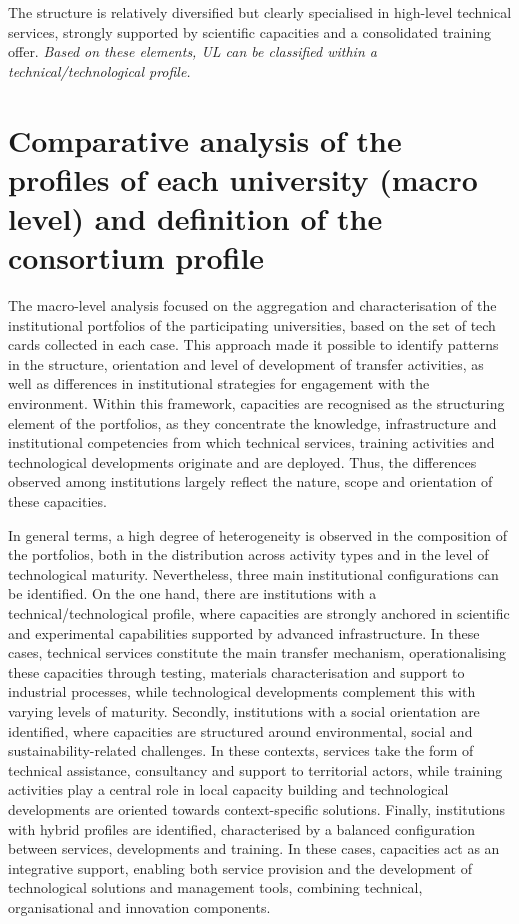 \documentclass[
  12pt,
  oneside]{book}
\begin{document}
The structure is relatively diversified but clearly specialised in
high-level technical services, strongly supported by scientific
capacities and a consolidated training offer. \emph{Based on these
elements, UL can be classified within a technical/technological
profile.}

\section{Comparative analysis of the profiles of each university (macro
level) and definition of the consortium
profile}\label{comparative-analysis-of-the-profiles-of-each-university-macro-level-and-definition-of-the-consortium-profile}

The macro-level analysis focused on the aggregation and characterisation
of the institutional portfolios of the participating universities, based
on the set of tech cards collected in each case. This approach made it
possible to identify patterns in the structure, orientation and level of
development of transfer activities, as well as differences in
institutional strategies for engagement with the environment. Within
this framework, capacities are recognised as the structuring element of
the portfolios, as they concentrate the knowledge, infrastructure and
institutional competencies from which technical services, training
activities and technological developments originate and are deployed.
Thus, the differences observed among institutions largely reflect the
nature, scope and orientation of these capacities.

In general terms, a high degree of heterogeneity is observed in the
composition of the portfolios, both in the distribution across activity
types and in the level of technological maturity. Nevertheless, three
main institutional configurations can be identified. On the one hand,
there are institutions with a technical/technological profile, where
capacities are strongly anchored in scientific and experimental
capabilities supported by advanced infrastructure. In these cases,
technical services constitute the main transfer mechanism,
operationalising these capacities through testing, materials
characterisation and support to industrial processes, while
technological developments complement this with varying levels of
maturity. Secondly, institutions with a social orientation are
identified, where capacities are structured around environmental, social
and sustainability-related challenges. In these contexts, services take
the form of technical assistance, consultancy and support to territorial
actors, while training activities play a central role in local capacity
building and technological developments are oriented towards
context-specific solutions. Finally, institutions with hybrid profiles
are identified, characterised by a balanced configuration between
services, developments and training. In these cases, capacities act as
an integrative support, enabling both service provision and the
development of technological solutions and management tools, combining
technical, organisational and innovation components.
\end{document}
